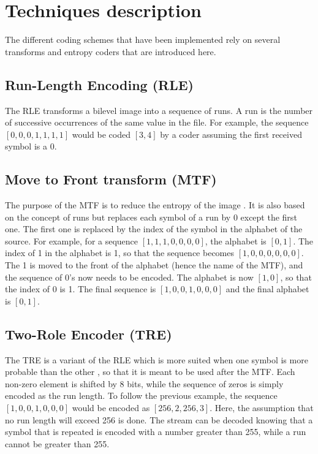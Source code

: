 \vspace*{-0.4cm}
\section{Techniques description}

The different coding schemes that have been implemented rely on several transforms and entropy coders that are introduced here.

\subsection{Run-Length Encoding (RLE)}

The RLE transforms a bilevel image into a sequence of runs. A run is the number of successive occurrences of the same value in the file. For example, the sequence $[0,0,0,1,1,1,1]$ would be coded $[3,4]$ by a coder assuming the first received symbol is a $0$.

\subsection{Move to Front transform (MTF)}

The purpose of the MTF is to reduce the entropy of the image \cite{benzid}. It is also based on the concept of runs but replaces each symbol of a run by 0 except the first one. The first one is replaced by the index of the symbol in the alphabet of the source. For example, for a sequence $[1,1,1,0,0,0,0]$, the alphabet is $[0,1]$. The index of 1 in the alphabet is 1, so that the sequence becomes $[1,0,0,0,0,0,0]$. The 1 is moved to the front of the alphabet (hence the name of the MTF), and the sequence of 0's now needs to be encoded. The alphabet is now $[1,0]$, so that the index of 0 is 1. The final sequence is $[1,0,0,1,0,0,0]$ and the final alphabet is $[0,1]$.

\subsection{Two-Role Encoder (TRE)}

The TRE is a variant of the RLE which is more suited when one symbol is more probable than the other \cite{benzid}, so that it is meant to be used after the MTF. Each non-zero element is shifted by 8 bits, while the sequence of zeros is simply encoded as the run length. To follow the previous example, the sequence $[1,0,0,1,0,0,0]$ would be encoded as $[256,2,256,3]$. Here, the assumption that no run length will exceed 256 is done. The stream can be decoded knowing that a symbol that is repeated is encoded with a number greater than 255, while a run cannot be greater than 255.

